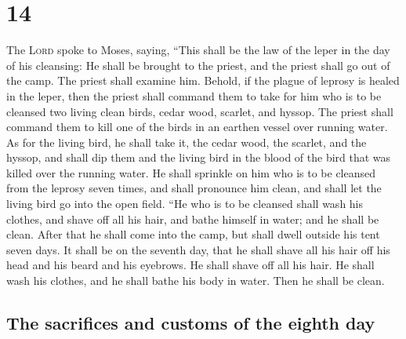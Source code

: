\hypertarget{section-13}{%
\section{14}\label{section-13}}

 The \textsc{Lord} spoke to Moses, saying, 
``This shall be the law of the leper in the day of his cleansing: He
shall be brought to the priest,  and the priest shall go
out of the camp. The priest shall examine him. Behold, if the plague of
leprosy is healed in the leper,  then the priest shall
command them to take for him who is to be cleansed two living clean
birds, cedar wood, scarlet, and hyssop.  The priest shall
command them to kill one of the birds in an earthen vessel over running
water.  As for the living bird, he shall take it, the
cedar wood, the scarlet, and the hyssop, and shall dip them and the
living bird in the blood of the bird that was killed over the running
water.  He shall sprinkle on him who is to be cleansed
from the leprosy seven times, and shall pronounce him clean, and shall
let the living bird go into the open field.  ``He who is
to be cleansed shall wash his clothes, and shave off all his hair, and
bathe himself in water; and he shall be clean. After that he shall come
into the camp, but shall dwell outside his tent seven days.
 It shall be on the seventh day, that he shall shave all
his hair off his head and his beard and his eyebrows. He shall shave off
all his hair. He shall wash his clothes, and he shall bathe his body in
water. Then he shall be clean.

\hypertarget{the-sacrifices-and-customs-of-the-eighth-day}{%
\subsection{The sacrifices and customs of the eighth
day}\label{the-sacrifices-and-customs-of-the-eighth-day}}

